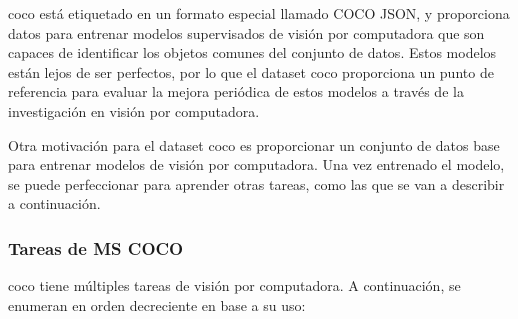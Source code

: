 \gls{coco} está etiquetado en un formato especial llamado COCO JSON, y proporciona datos para entrenar modelos supervisados de visión por computadora que son capaces de identificar los objetos comunes del conjunto de datos. Estos modelos están lejos de ser perfectos, por lo que el dataset \gls{coco} proporciona un punto de referencia para evaluar la mejora periódica de estos modelos a través de la investigación en visión por computadora.

Otra motivación para el dataset \gls{coco} es proporcionar un conjunto de datos base para entrenar modelos de visión por computadora. Una vez entrenado el modelo, se puede perfeccionar para aprender otras tareas, como las que se van a describir a continuación.

\subsubsection*{Tareas de MS COCO}
\label{subsubsec:tareas-coco}

\gls{coco} tiene múltiples tareas de visión por computadora. A continuación, se enumeran en orden decreciente en base a su uso:

